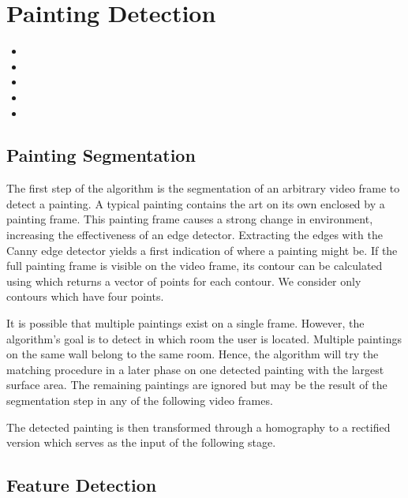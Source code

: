 \section{Painting Detection}
	\begin{itemize}
		\item {}
		\item {}
		\item {}
		\item {}
		\item {}
	\end{itemize}

	
	\subsection{Painting Segmentation}
	The first step of the algorithm is the segmentation of an arbitrary video frame to detect a painting. A typical painting contains the art on its own enclosed by a painting frame. This painting frame causes a strong change in environment, increasing the effectiveness of an edge detector. Extracting the edges with the Canny edge detector yields a first indication of where a painting might be. If the full painting frame is visible on the video frame, its contour can be calculated using \cite{SUZUKI198532} which returns a vector of points for each contour. We consider only contours which have four points.
	
	It is possible that multiple paintings exist on a single frame. However, the algorithm's goal is to detect in which room the user is located. Multiple paintings on the same wall belong to the same room. Hence, the algorithm will try the matching procedure in a later phase on one detected painting with the largest surface area. The remaining paintings are ignored but may be the result of the segmentation step in any of the following video frames.
	
	The detected painting is then transformed through a homography to a rectified version which serves as the input of the following stage.
	
	\subsection{Feature Detection}
	
	
